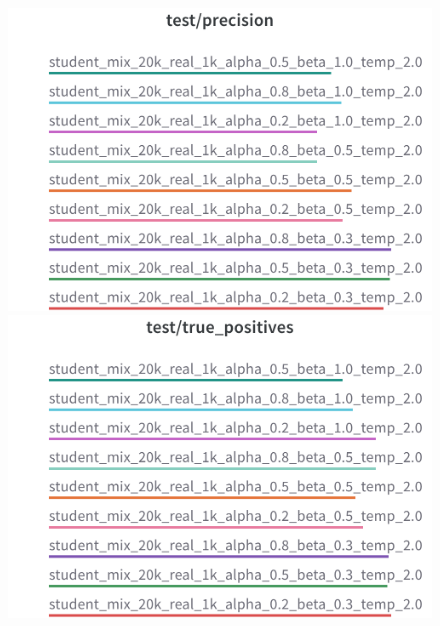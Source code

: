 \begin{figure}[H]
  \includegraphics[width=\linewidth]{./reports/alpha_x_beta/charts/Section-2-Panel-4-zmm231e0v.png}
  \caption{}
  \endminipage\hfill
  \includegraphics[width=\linewidth]{./reports/alpha_x_beta/charts/Section-2-Panel-5-not4mjy68.png}
  \caption{}
  \endminipage
\end{figure}

